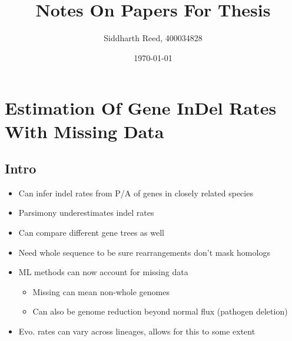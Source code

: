 \documentclass[10pt,letter]{article}
\begin{document}
\title{\vspace{-1in}Notes On Papers For Thesis}
\author{Siddharth Reed, 400034828}
\date{\today}
\maketitle
\section*{Estimation Of Gene InDel Rates With Missing Data\cite{indelmiss}}
\subsection*{Intro}
\begin{itemize}
    \item Can infer indel rates from P/A of genes in closely related species
    \item Parsimony underestimates indel rates
    \item Can compare different gene trees as well
    \item Need whole sequence to be sure rearrangements don't mask homologs
    \item ML methods can now account for missing data
    \begin{itemize}
        \item Missing can mean non-whole genomes
        \item Can also be genome reduction beyond normal flux (pathogen deletion)
    \end{itemize}
    \item Evo. rates can vary across lineages, allows for this to some extent
\end{itemize}
\end{document}
